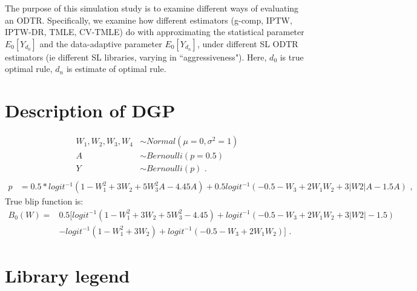 \documentclass[11pt]{article}\usepackage[]{graphicx}\usepackage[]{color}
\begin{document}
The purpose of this simulation study is to examine different ways of evaluating an ODTR. Specifically, we examine how different estimators (g-comp, IPTW, IPTW-DR, TMLE, CV-TMLE) do with approximating the statistical parameter $E_0[Y_{d_0}]$ and the data-adaptive parameter $E_0[Y_{d_n}]$, under different SL ODTR estimators (ie different SL libraries, varying in ``aggressiveness"). Here, $d_0$ is true optimal rule, $d_n$ is estimate of optimal rule.










\section{Description of DGP}

\begin{align*}
W_1,W_2,W_3,W_4 &\sim Normal(\mu=0,\sigma^2=1) \\
A &\sim Bernoulli(p=0.5) \\
Y &\sim Bernoulli(p) \text{ .}\\
\end{align*}
\begin{align*}
p &= 0.5*logit^{-1} (1-W_1^2  + 3W_2  + 5W_3^2 A - 4.45A)+0.5logit^{-1} (-0.5- W_3  + 2W_1 W_2  + 3|W2|A - 1.5A) \text{ ,}
\end{align*}
True blip function is:
\begin{align*}
    B_0 (W)= & 0.5[logit^{-1} (1-W_1^2  + 3W_2  + 5W_3^2  - 4.45)+logit^{-1} (-0.5- W_3  + 2W_1 W_2  + 3|W2|  - 1.5)\\
& - logit^{-1} (1-W_1^2  + 3W_2 )+logit^{-1} (-0.5- W_3  + 2W_1 W_2 )] \text{ .}
\end{align*}







\section{Library legend}
\end{document}
